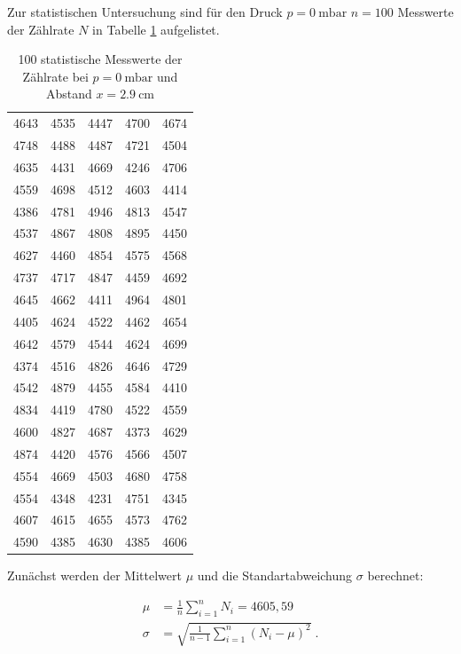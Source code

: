       Zur statistischen Untersuchung sind für den Druck $p = \SI{0}{\milli\bar}$ $n = 100$ Messwerte der
      Zählrate $N$ in Tabelle \ref{tab:mess3} aufgelistet.

    \begin{table}
      \centering
      \caption{100 statistische Messwerte der Zählrate bei $p = \SI{0}{\milli\bar}$ und Abstand 
          $x = \SI{2.9}{\centi\meter}$}
      \label{tab:mess3}
      \begin{tabular}{c c c c c}
      \toprule
          4643 & 4535 & 4447 & 4700 & 4674 \\
          4748 & 4488 & 4487 & 4721 & 4504 \\
          4635 & 4431 & 4669 & 4246 & 4706 \\
          4559 & 4698 & 4512 & 4603 & 4414 \\
          4386 & 4781 & 4946 & 4813 & 4547 \\
          4537 & 4867 & 4808 & 4895 & 4450 \\
          4627 & 4460 & 4854 & 4575 & 4568 \\
          4737 & 4717 & 4847 & 4459 & 4692 \\
          4645 & 4662 & 4411 & 4964 & 4801 \\
          4405 & 4624 & 4522 & 4462 & 4654 \\
          4642 & 4579 & 4544 & 4624 & 4699 \\
          4374 & 4516 & 4826 & 4646 & 4729 \\
          4542 & 4879 & 4455 & 4584 & 4410 \\
          4834 & 4419 & 4780 & 4522 & 4559 \\
          4600 & 4827 & 4687 & 4373 & 4629 \\
          4874 & 4420 & 4576 & 4566 & 4507 \\
          4554 & 4669 & 4503 & 4680 & 4758 \\
          4554 & 4348 & 4231 & 4751 & 4345 \\
          4607 & 4615 & 4655 & 4573 & 4762 \\
          4590 & 4385 & 4630 & 4385 & 4606 \\
      \bottomrule
      \end{tabular}
      \end{table}

    Zunächst werden der Mittelwert $\mu$ und die Standartabweichung $\sigma$ berechnet:

    \begin{align}
        \mu &= \frac{1}{n} \sum_{i=1}^n N_i = 4605,59 \\
        \sigma &= \sqrt{ \frac{1}{n-1} \sum_{i=1}^n (N_i - \mu)^2  } \; .
    \end{align}

